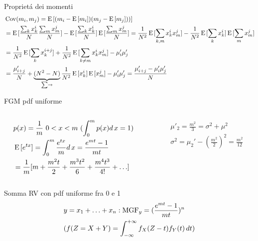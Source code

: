 \documentclass[asd-beamer.tex]{subfiles}%
\begin{document}
\begin{frame}{Propriet\'a dei momenti}
    \begin{align*}
    &\operatorname{Cov}(m_i,m_j)=\operatorname{E}{[(m_i-\operatorname{E}{[m_i])(m_j-\operatorname{E}{[m_j]})})]}\\
    &=\operatorname{E}{[\frac{\sum_kx_k^i}{N}\frac{\sum_mx_m^j}{N}]}-\operatorname{E}{[\frac{\sum_kx_k^i}{N}]}\operatorname{E}{[\frac{\sum_mx_m^j}{N}]}=\frac{1}{N^2}\operatorname{E}{[\sum_{k,m}x_k^ix_m^j]}-\frac{1}{N^2}\operatorname{E}{[\sum_kx_k^i]}\operatorname{E}{[\sum_mx_m^j]}\\
        &=\frac{1}{N^2}\operatorname{E}{[\sum_kx_k^{i+j}]}+\frac{1}{N^2}\operatorname{E}{[\sum_{k\neq m}x_k^ix_m^j]}-\mu_i'\mu_j'\\
        &=\frac{\mu_{i+j}'}{N}+\underbrace{(N^2-N)}_{\sum\to}\frac{1}{N^2}\operatorname{E}{[x_k^i]}\operatorname{E}{[x_m^j]}-\mu_i'\mu_j'=\frac{\mu_{i+j}'-\mu_i'\mu_j'}{N}
    \end{align*}
\end{frame}

\begin{wordonframe}{FGM pdf uniforme}
\begin{columns}[T]
\begin{column}{0.5\textwidth}
\begin{align*}
&p(x)=\frac{1}{m}\ 0<x<m\ (\int_0^mp(x)d\,x=1)\\
&\operatorname{E}{[e^{tx}]}=\int_0^m\frac{e^{tx}}{m}d\,x=\frac{e^{mt}-1}{mt}\\
&=\frac{1}{m}[m+\frac{m^2t}{2}+\frac{m^3t^2}{6}+\frac{m^4t^3}{4!}+\ldots]
\end{align*}
\end{column}
\begin{column}{0.5\textwidth}
\begin{align*}
&\mu'_2=\frac{m^2}{3}=\sigma^2+\mu^2\\
&\sigma^2=\mu_2'-(\frac{m^2}{2})^2=\frac{m^2}{12}
\end{align*}
\end{column}
\end{columns}
\begin{block}{Somma RV con pdf uniforme fra 0 e 1}
\begin{align*}
&y=x_1+\ldots+x_n: \operatorname{MGF}_y=(\frac{e^{mt}-1}{mt})^n\\
&(f(Z=X+Y)=\int_{-\infty}^{+\infty}{}f_X(Z-t)f_Y(t)\,dt)
\end{align*}
\end{block}
\end{wordonframe}
\end{document}
